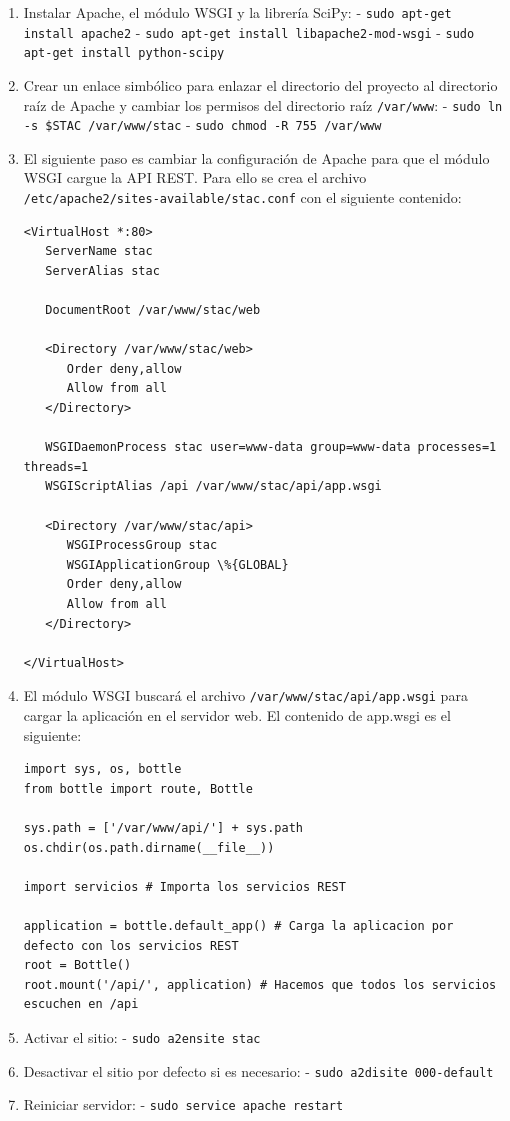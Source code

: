 \begin{enumerate}
\item Instalar Apache, el módulo WSGI y la librería SciPy:
\subitem - \texttt{sudo apt-get install apache2}
\subitem - \texttt{sudo apt-get install libapache2-mod-wsgi}
\subitem - \texttt{sudo apt-get install python-scipy}
\item Crear un enlace simbólico para enlazar el directorio del proyecto al directorio raíz de Apache y cambiar los permisos del directorio raíz \texttt{/var/www}:
\subitem - \texttt{sudo ln -s \$STAC /var/www/stac}
\subitem - \texttt{sudo chmod -R 755 /var/www}
\item El siguiente paso es cambiar la configuración de Apache para que el módulo WSGI cargue la API REST. Para ello se crea el archivo \texttt{/etc/apache2/sites-available/stac.conf} con el siguiente contenido:
\begin{lstlisting}
<VirtualHost *:80>
   ServerName stac
   ServerAlias stac
   
   DocumentRoot /var/www/stac/web
   
   <Directory /var/www/stac/web>
      Order deny,allow
      Allow from all
   </Directory>

   WSGIDaemonProcess stac user=www-data group=www-data processes=1 threads=1
   WSGIScriptAlias /api /var/www/stac/api/app.wsgi
   
   <Directory /var/www/stac/api>
      WSGIProcessGroup stac
      WSGIApplicationGroup \%{GLOBAL}
      Order deny,allow
      Allow from all
   </Directory>

</VirtualHost>
\end{lstlisting}
\item El módulo WSGI buscará el archivo \texttt{/var/www/stac/api/app.wsgi} para cargar la aplicación en el servidor web. El contenido de app.wsgi es el siguiente:
\begin{lstlisting}
import sys, os, bottle
from bottle import route, Bottle

sys.path = ['/var/www/api/'] + sys.path
os.chdir(os.path.dirname(__file__))

import servicios # Importa los servicios REST

application = bottle.default_app() # Carga la aplicacion por defecto con los servicios REST
root = Bottle()
root.mount('/api/', application) # Hacemos que todos los servicios escuchen en /api
\end{lstlisting}
\item Activar el sitio:
\subitem - \texttt{sudo a2ensite stac}
\item Desactivar el sitio por defecto si es necesario:
\subitem - \texttt{sudo a2disite 000-default}
\item Reiniciar servidor:
\subitem - \texttt{sudo service apache restart}
\end{enumerate}